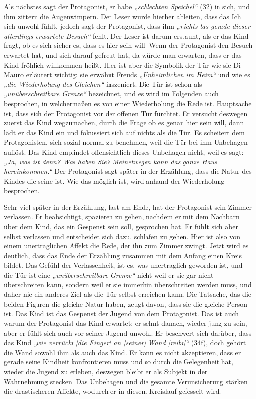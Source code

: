 \documentclass[12pt,a4paper]{article}
\begin{document}
Als nächstes sagt der Protagonist, er habe \textit{„schlechten Speichel“} (32) in sich, und ihm zittern die Augenwimpern. Der Leser wurde hierher ableiten, dass das Ich sich unwohl fühlt, jedoch sagt der Protagonist, dass ihm \textit{„nichts las gerade dieser allerdings erwartete Besuch“} fehlt. Der Leser ist darum erstaunt, als er das Kind fragt, ob es sich sicher es, dass es hier sein will. Wenn der Protagonist den Besuch erwartet hat, und sich darauf gefreut hat, da würde man erwarten, dass er das Kind fröhlich willkommen heißt. Hier ist aber die Symbolik der Tür wie sie Di Mauro erläutert wichtig: sie erwähnt Freuds \textit{„Unheimlichen im Heim“}\autocite[71]{mauro} und wie es \textit{„die Wiederholung des Gleichen“} inszeniert. Die Tür ist schon als \textit{„unüberschreitbare Grenze“} bezeichnet, und es wird im Folgenden auch besprochen, in welchermaßen es von einer Wiederholung die Rede ist. Hauptsache ist, dass sich der Protagonist vor der offenen Tür fürchtet. Er versucht deswegen zuerst das Kind wegzumachen, durch die Frage ob es genau hier sein will, dann lädt er das Kind ein und fokussiert sich auf nichts als die Tür. Es scheitert dem Protagonisten, sich sozial normal zu benehmen, weil die Tür bei ihm Unbehagen auflöst. Das Kind empfindet offensichtlich dieses Unbehagen nicht, weil es sagt: \textit{„Ja, was ist denn? Was haben Sie? Meinetwegen kann das ganze Haus hereinkommen.“} Der Protagonist sagt später in der Erzählung, dass die Natur des Kindes die seine ist. Wie das möglich ist, wird anhand der Wiederholung besprochen.\par
%
Sehr viel später in der Erzählung, fast am Ende, hat der Protagonist sein Zimmer verlassen. Er beabsichtigt, spazieren zu gehen, nachdem er mit dem Nachbarn über dem Kind, das ein Gespenst sein soll, gesprochen hat. Er fühlt sich aber selbst verlassen und entscheidet sich dazu, schlafen zu gehen. Hier ist also von einem unertraglichen Affekt die Rede, der ihn zum Zimmer zwingt. Jetzt wird es deutlich, dass das Ende der Erzählung zusammen mit dem Anfang einen Kreis bildet. Das Gefühl der Verlassenheit, ist es, was unertraglich geworden ist, und die Tür ist eine \textit{„unüberschreitbare Grenze“} nicht weil er sie gar nicht überschreiten kann, sondern weil er sie immerhin überschreiten werden muss, und daher nie ein anderes Ziel als die Tür selbst erreichen kann. Die Tatsache, das die beiden Figuren die gleiche Natur haben, zeugt davon, dass sie die gleiche Person ist. Das Kind ist das Gespenst der Jugend von dem Protagonist. Das ist auch warum der Protagonist das Kind erwartet: er sehnt danach, wieder jung zu sein, aber er fühlt sich auch vor seiner Jugend unwohl. Er beschwert sich darüber, dass das Kind \textit{„wie verrückt [die Finger] an [seiner] Wand [reibt]“} (34f), doch gehört die Wand sowohl ihm als auch das Kind. Er kann es nicht akzeptieren, dass er gerade seine Kindheit konfrontieren muss und so durch die Gelegenheit hat, wieder die Jugend zu erleben, deswegen bleibt er als Subjekt in der Wahrnehmung stecken. Das Unbehagen und die gesamte Verunsicherung stärken die drastischeren Affekte, wodurch er in diesem Kreislauf gefesselt wird. 
\clearpage
%
\end{document}
